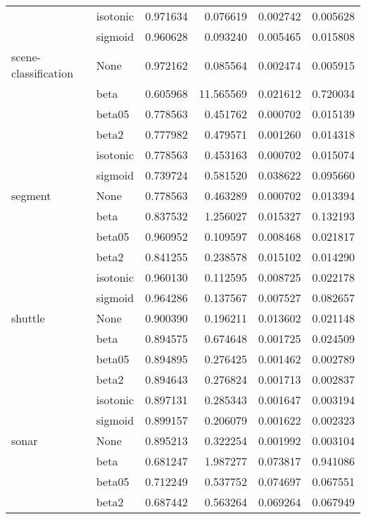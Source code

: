 \begin{tabular}{llrrrr}
        & isotonic &  0.971634 &   0.076619 &  0.002742 &  0.005628 \\
        & sigmoid &  0.960628 &   0.093240 &  0.005465 &  0.015808 \\
scene-classification & None &  0.972162 &   0.085564 &  0.002474 &  0.005915 \\
        & beta &  0.605968 &  11.565569 &  0.021612 &  0.720034 \\
        & beta05 &  0.778563 &   0.451762 &  0.000702 &  0.015139 \\
        & beta2 &  0.777982 &   0.479571 &  0.001260 &  0.014318 \\
        & isotonic &  0.778563 &   0.453163 &  0.000702 &  0.015074 \\
        & sigmoid &  0.739724 &   0.581520 &  0.038622 &  0.095660 \\
segment & None &  0.778563 &   0.463289 &  0.000702 &  0.013394 \\
        & beta &  0.837532 &   1.256027 &  0.015327 &  0.132193 \\
        & beta05 &  0.960952 &   0.109597 &  0.008468 &  0.021817 \\
        & beta2 &  0.841255 &   0.238578 &  0.015102 &  0.014290 \\
        & isotonic &  0.960130 &   0.112595 &  0.008725 &  0.022178 \\
        & sigmoid &  0.964286 &   0.137567 &  0.007527 &  0.082657 \\
shuttle & None &  0.900390 &   0.196211 &  0.013602 &  0.021148 \\
        & beta &  0.894575 &   0.674648 &  0.001725 &  0.024509 \\
        & beta05 &  0.894895 &   0.276425 &  0.001462 &  0.002789 \\
        & beta2 &  0.894643 &   0.276824 &  0.001713 &  0.002837 \\
        & isotonic &  0.897131 &   0.285343 &  0.001647 &  0.003194 \\
        & sigmoid &  0.899157 &   0.206079 &  0.001622 &  0.002323 \\
sonar & None &  0.895213 &   0.322254 &  0.001992 &  0.003104 \\
        & beta &  0.681247 &   1.987277 &  0.073817 &  0.941086 \\
        & beta05 &  0.712249 &   0.537752 &  0.074697 &  0.067551 \\
        & beta2 &  0.687442 &   0.563264 &  0.069264 &  0.067949 \\

\end{tabular}

